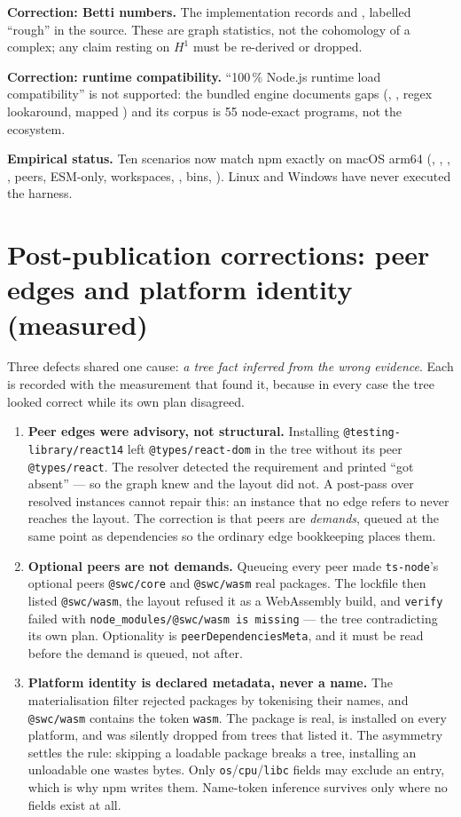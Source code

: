 \documentclass[
  11pt,
  letterpaper,
]{article}
\begin{document}
\textbf{Correction: Betti numbers.} The implementation records
 and , labelled ``rough'' in the source.
These are graph statistics, not the cohomology of a complex; any claim resting on $H^1$ must be
re-derived or dropped.

\textbf{Correction: runtime compatibility.} ``100\,\% Node.js runtime load compatibility'' is not
supported: the bundled engine documents gaps (, , regex lookaround,
mapped ) and its corpus is 55 node-exact programs, not the ecosystem.

\textbf{Empirical status.} Ten scenarios now match npm exactly on macOS arm64
(, , , ,  peers, ESM-only, workspaces,
, bins, ). Linux and Windows have never executed the harness.


\section{Post-publication corrections: peer edges and platform identity (measured)}

Three defects shared one cause: \emph{a tree fact inferred from the wrong evidence}. Each is recorded
with the measurement that found it, because in every case the tree looked correct while its own plan
disagreed.

\begin{enumerate}
\item \textbf{Peer edges were advisory, not structural.} Installing \texttt{@testing-library/react\@14}
left \texttt{@types/react-dom} in the tree without its peer \texttt{@types/react}. The resolver
detected the requirement and printed ``got absent'' --- so the graph knew and the layout did not. A
post-pass over resolved instances cannot repair this: an instance that no edge refers to never
reaches the layout. The correction is that peers are \emph{demands}, queued at the same point as
dependencies so the ordinary edge bookkeeping places them.
\item \textbf{Optional peers are not demands.} Queueing every peer made \texttt{ts-node}'s optional
peers \texttt{@swc/core} and \texttt{@swc/wasm} real packages. The lockfile then listed
\texttt{@swc/wasm}, the layout refused it as a WebAssembly build, and \texttt{verify} failed with
\texttt{node_modules/@swc/wasm is missing} --- the tree contradicting its own plan. Optionality is
\texttt{peerDependenciesMeta}, and it must be read before the demand is queued, not after.
\item \textbf{Platform identity is declared metadata, never a name.} The materialisation filter
rejected packages by tokenising their names, and \texttt{@swc/wasm} contains the token \texttt{wasm}.
The package is real, is installed on every platform, and was silently dropped from trees that listed
it. The asymmetry settles the rule: skipping a loadable package breaks a tree, installing an
unloadable one wastes bytes. Only \texttt{os}/\texttt{cpu}/\texttt{libc} fields may exclude an entry,
which is why npm writes them. Name-token inference survives only where no fields exist at all.
\end{enumerate}
\end{document}
